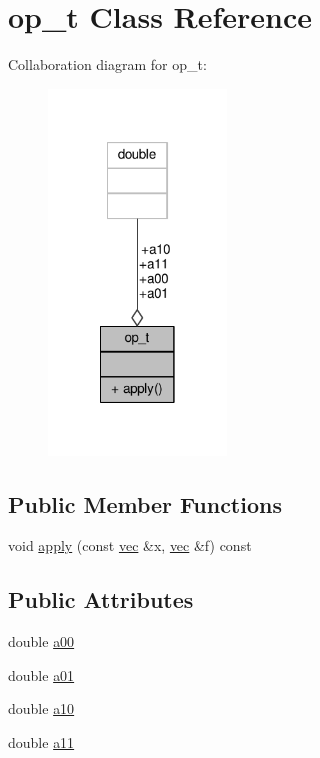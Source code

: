 \hypertarget{classop__t}{\section{op\-\_\-t Class Reference}
\label{classop__t}
}


Collaboration diagram for op\-\_\-t\-:
\nopagebreak
\begin{figure}[H]
\begin{center}
\leavevmode
\includegraphics[width=134pt]{classop__t__coll__graph}
\end{center}
\end{figure}
\subsection*{Public Member Functions}
\begin{DoxyCompactItemize}
\item 
void \hyperlink{classop__t_a77bfd7679842b8282dd218f8867c97c5}{apply} (const \hyperlink{classvec}{vec} \&x, \hyperlink{classvec}{vec} \&f) const 
\end{DoxyCompactItemize}
\subsection*{Public Attributes}
\begin{DoxyCompactItemize}
\item 
double \hyperlink{classop__t_aa85db899997dd8d4835aea4e2498e25c}{a00}
\item 
double \hyperlink{classop__t_a7fb7af51075936ef7683f98620f598df}{a01}
\item 
double \hyperlink{classop__t_ab92d6c13ec47d084b3b11d9d86bd9aca}{a10}
\item 
double \hyperlink{classop__t_a4c292fc6b1f66e40b717cc8318d3747c}{a11}
\end{DoxyCompactItemize}


